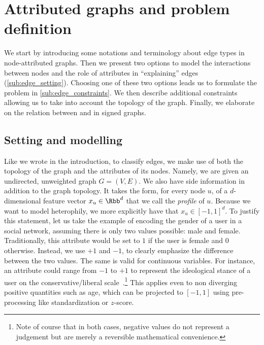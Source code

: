 \section{Attributed graphs and problem definition}
\label{sec:edge_problem}

We start by introducing some notations and terminology about edge types in node-attributed graphs.
Then we present two options to model the interactions between nodes and the role of attributes in
\enquote{explaining} edges (\autoref{sub:edge_setting}). Choosing one of these two options leads us to
formulate the \ecp{} problem in \autoref{sub:edge_constraints}. We then describe additional
constraints allowing us to take into account the topology of the graph. Finally, we elaborate on the relation
between \ecp{} and \esp{} in signed graphs.

\subsection{Setting and modelling}
\label{sub:edge_setting}

Like we wrote in the introduction, to classify edges, we make use of both the topology of the graph
and the attributes of its nodes. Namely, we are given an undirected, unweighted graph $G=(V,E)$.  We
also have side information in addition to the graph topology. It takes the form, for every node $u$,
of a $d$-dimensional feature vector $x_u \in \Rbb^d$ that we call the \emph{profile} of $u$.
Because we want to model heterophily, we more explicitly have that $x_u \in [-1, 1]^d$. To justify
this statement, let us take the example of encoding the gender of a user in a social network,
assuming there is only two values possible: male and female. Traditionally, this attribute would be
set to $1$ if the user is female and $0$ otherwise. Instead, we use $+1$ and $-1$, to clearly
emphasize the difference between the two values. The same is valid for continuous variables. For
instance, an attribute could range from $-1$ to $+1$ to represent the ideological stance of a user
on the conservative/liberal scale~\autocite{newsBias15}.\footnote{Note of course that in both cases,
negative values do not represent a judgement but are merely a reversible mathematical convenience.}
This applies even to non diverging positive quantities such as age, which can be projected to $[-1,
1]$ using pre-processing like standardization or $z$-score.

